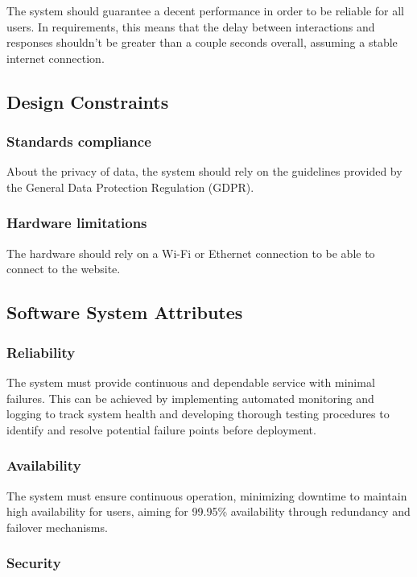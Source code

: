 \documentclass{article}
\begin{document}
The system should guarantee a decent performance in order to be reliable for all users. In requirements, this means that the delay between interactions and responses shouldn't be greater than a couple seconds overall, assuming a stable internet connection.

\subsection{Design Constraints}

\subsubsection{Standards compliance}

About the privacy of data, the system should rely on the guidelines provided by the General Data Protection Regulation (GDPR).

\subsubsection{Hardware limitations}

The hardware should rely on a Wi-Fi or Ethernet connection to be able to connect to the website.

\subsection{Software System Attributes}

\subsubsection{Reliability}

The system must provide continuous and dependable service with minimal failures. This can be achieved by implementing automated monitoring and logging to track system health and developing thorough testing procedures to identify and resolve potential failure points before deployment.

\subsubsection{Availability}

The system must ensure continuous operation, minimizing downtime to maintain high availability for users, aiming for 99.95\% availability through redundancy and failover mechanisms.

\subsubsection{Security}
\end{document}
